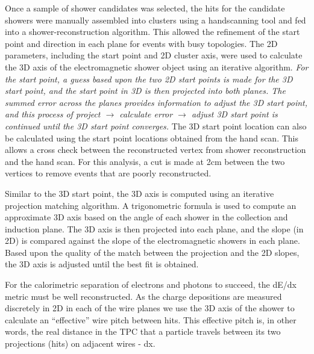 


Once a sample of shower candidates was selected, the hits for the candidate 
showers were manually assembled into clusters using a handscanning tool and fed into a 
shower-reconstruction algorithm. This allowed the refinement of the start point 
and direction in each plane for events with busy topologies.
The 2D parameters, including the start point and 2D cluster axis, were used to calculate the 
3D axis of the electromagnetic shower object using an iterative algorithm.  \textit{For 
the start point, a guess based upon the two 2D start points is made for the 3D 
start point, and the start point in 3D is then projected into both planes.  The 
summed error across the planes provides information to adjust the 3D start 
point, and this process of project $\rightarrow$ calculate error $\rightarrow$ 
adjust 3D start point is continued until the 3D start point converges.}  
The 3D start point location can also be calculated using the start point 
locations obtained from the hand scan.  This allows a cross check between the 
reconstructed vertex from shower reconstruction and the hand scan.  For this 
analysis, a cut is made at 2cm between the two vertices to remove events that 
are poorly reconstructed. 

Similar to the 3D start point, the 3D axis is computed using an iterative 
projection matching algorithm.  A trigonometric formula is used to compute an 
approximate 3D axis based on the angle of each shower in the collection and 
induction plane.  The 3D axis is then projected into each plane, and the slope 
(in 2D) is compared against the slope of the electromagnetic showers in each 
plane.  Based upon the quality of the match between the projection and the 2D 
slopes, the 3D axis is adjusted until the best fit is obtained.

For the calorimetric separation of electrons and photons to succeed, the dE/dx 
metric must be well reconstructed. %
As the charge depositions are measured discretely in 2D 
in each of the wire planes we use the 3D 
axis of the shower to calculate an ``effective'' wire pitch between hits.  This 
effective pitch is, in other words, the real distance in the TPC that a particle 
travels between its two projections (hits) on adjacent wires - dx. 



